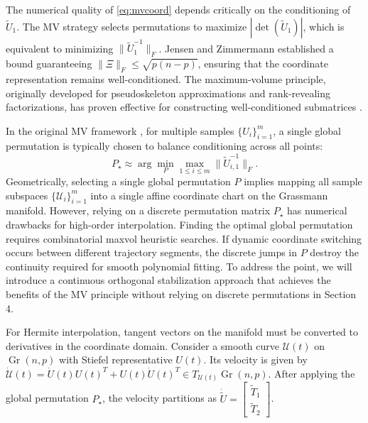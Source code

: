 \documentclass[11pt]{article}
\DeclareMathOperator{\Gr}{Gr}
\begin{document}

The numerical quality of \eqref{eq:mvcoord} depends critically on the conditioning of $\widetilde U_1$. The MV strategy selects permutations to maximize $|\det(\widetilde U_1)|$, which is equivalent to minimizing $\|\widetilde U_1^{-1}\|_F$. Jensen and Zimmermann \cite{jensen2024maximum} established a bound guaranteeing $\|\Xi\|_F \le \sqrt{p(n-p)}$, ensuring that the coordinate representation remains well-conditioned. The maximum-volume principle, originally developed for pseudoskeleton approximations and rank-revealing factorizations, has proven effective for constructing well-conditioned submatrices \cite{goreinov1997theory, goreinov2010how}.

In the original MV framework \cite{jensen2024maximum} , for multiple samples $\{U_i\}_{i=1}^m$, a single global permutation is typically chosen to balance conditioning across all points:
\begin{equation}
    P_\star \approx \arg \min_P \max_{1\le i\le m} \| \tilde{U}_{i,1}^{-1} \|_F. \label{eq:maxvol}
\end{equation}
Geometrically, selecting a single global permutation $P$ implies mapping all sample subspaces $\{\mathcal{U}_i\}_{i=1}^m$ into a single affine coordinate chart on the Grassmann manifold. However, relying on a discrete permutation matrix $P_\star$ has numerical drawbacks for high-order interpolation. Finding the optimal global permutation requires combinatorial maxvol heuristic searches. If dynamic coordinate switching occurs between different trajectory segments, the discrete jumps in $P$ destroy the continuity required for smooth polynomial fitting. To address the point, we will introduce a continuous orthogonal stabilization approach that achieves the benefits of the MV principle without relying on discrete permutations in Section 4.


For Hermite interpolation, tangent vectors on the manifold must be converted to derivatives in the coordinate domain. Consider a smooth curve $\mathcal{U}(t)$ on $\Gr(n,p)$ with Stiefel representative $U(t)$. Its velocity is given by $\dot{\mathcal{U}}(t) = \dot{U}(t)U(t)^T + U(t)\dot{U}(t)^T \in T_{\mathcal{U}(t)}\Gr(n,p)$. After applying the global permutation $P_\star$, the velocity partitions as $\dot{\widetilde U}=\begin{bmatrix}\widetilde T_1\\ \widetilde T_2\end{bmatrix}$.
\end{document}

